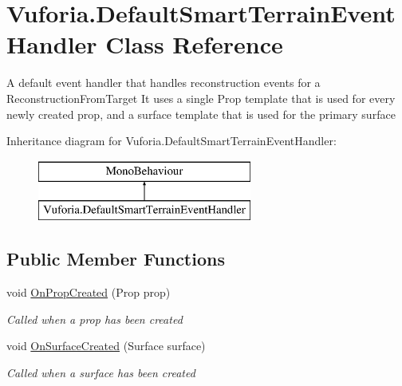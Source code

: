 \hypertarget{class_vuforia_1_1_default_smart_terrain_event_handler}{}\section{Vuforia.\+Default\+Smart\+Terrain\+Event\+Handler Class Reference}
\label{class_vuforia_1_1_default_smart_terrain_event_handler}


A default event handler that handles reconstruction events for a Reconstruction\+From\+Target It uses a single Prop template that is used for every newly created prop, and a surface template that is used for the primary surface  


Inheritance diagram for Vuforia.\+Default\+Smart\+Terrain\+Event\+Handler\+:\begin{figure}[H]
\begin{center}
\leavevmode
\includegraphics[height=2.000000cm]{class_vuforia_1_1_default_smart_terrain_event_handler}
\end{center}
\end{figure}
\subsection*{Public Member Functions}
\begin{DoxyCompactItemize}
\item 
void \hyperlink{class_vuforia_1_1_default_smart_terrain_event_handler_a5b890bf684e83aae2f4a8ba83de4927a_a5b890bf684e83aae2f4a8ba83de4927a}{On\+Prop\+Created} (Prop prop)
\begin{DoxyCompactList}\small\item\em Called when a prop has been created \end{DoxyCompactList}\item 
void \hyperlink{class_vuforia_1_1_default_smart_terrain_event_handler_aff964c565156e13b6baa5d97196e5a0a_aff964c565156e13b6baa5d97196e5a0a}{On\+Surface\+Created} (Surface surface)
\begin{DoxyCompactList}\small\item\em Called when a surface has been created \end{DoxyCompactList}\end{DoxyCompactItemize}
